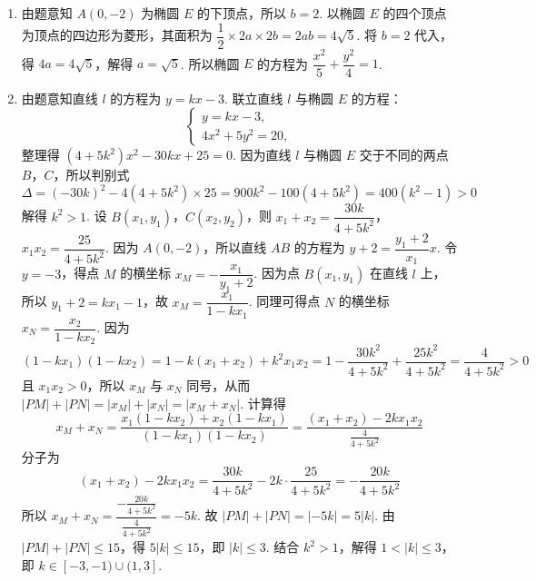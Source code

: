 \begin{solution}
\begin{enumerate}
    \item 由题意知 \(A(0,-2)\) 为椭圆 \(E\) 的下顶点，所以 \(b=2\).
以椭圆 \(E\) 的四个顶点为顶点的四边形为菱形，其面积为 \(\dfrac12\times 2a\times 2b=2ab=4\sqrt5\).
将 \(b=2\) 代入，得 \(4a=4\sqrt5\)，解得 \(a=\sqrt5\).
所以椭圆 \(E\) 的方程为 \(\dfrac{x^2}{5}+\dfrac{y^2}{4}=1\).
    \item 由题意知直线 \(l\) 的方程为 \(y=kx-3\).
联立直线 \(l\) 与椭圆 \(E\) 的方程：
\[
\begin{cases}
y=kx-3,\\
4x^2+5y^2=20,
\end{cases}
\]
整理得 \((4+5k^2)x^2-30kx+25=0\).
因为直线 \(l\) 与椭圆 \(E\) 交于不同的两点 \(B\)，\(C\)，所以判别式
\[
\Delta=(-30k)^2-4(4+5k^2)\times25=900k^2-100(4+5k^2)=400(k^2-1)>0
\]
解得 \(k^2>1\).
设 \(B(x_1,y_1)\)，\(C(x_2,y_2)\)，则 \(x_1+x_2=\dfrac{30k}{4+5k^2}\)，\(x_1 x_2=\dfrac{25}{4+5k^2}\).
因为 \(A(0,-2)\)，所以直线 \(AB\) 的方程为 \(y+2=\dfrac{y_1+2}{x_1}x\).
令 \(y=-3\)，得点 \(M\) 的横坐标 \(x_M=-\dfrac{x_1}{y_1+2}\).
因为点 \(B(x_1,y_1)\) 在直线 \(l\) 上，所以 \(y_1+2=kx_1-1\)，故 \(x_M=\dfrac{x_1}{1-kx_1}\).
同理可得点 \(N\) 的横坐标 \(x_N=\dfrac{x_2}{1-kx_2}\).
因为
\[
(1-kx_1)(1-kx_2)=1-k(x_1+x_2)+k^2x_1x_2=1-\frac{30k^2}{4+5k^2}+\frac{25k^2}{4+5k^2}=\frac{4}{4+5k^2}>0
\]
且 \(x_1 x_2>0\)，所以 \(x_M\) 与 \(x_N\) 同号，从而 \(|PM|+|PN|=|x_M|+|x_N|=|x_M+x_N|\).
计算得
\[
x_M+x_N=\frac{x_1(1-kx_2)+x_2(1-kx_1)}{(1-kx_1)(1-kx_2)}=\frac{(x_1+x_2)-2kx_1x_2}{\frac{4}{4+5k^2}}
\]
分子为
\[
(x_1+x_2)-2kx_1x_2=\frac{30k}{4+5k^2}-2k\cdot\frac{25}{4+5k^2}=-\frac{20k}{4+5k^2}
\]
所以 \(x_M+x_N=\dfrac{-\frac{20k}{4+5k^2}}{\frac{4}{4+5k^2}}=-5k\).
故 \(|PM|+|PN|=|-5k|=5|k|\).
由 \(|PM|+|PN|\le15\)，得 \(5|k|\le15\)，即 \(|k|\le3\).
结合 \(k^2>1\)，解得 \(1<|k|\le3\)，即 \(k\in[-3,-1)\cup(1,3]\).
\end{enumerate}
\end{solution}

